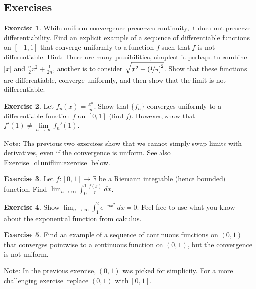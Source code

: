 \documentclass[12pt]{book}
\newcommand{\abs}[1]{\left\lvert {#1} \right\rvert}
\newcommand{\R}{{\mathbb{R}}}
\theoremstyle{plain}
\theoremstyle{remark}
\theoremstyle{definition}
\newenvironment{exnote}{\small}{}
\theoremstyle{exercise}
\newtheorem{exercise}{Exercise}[section]
\theoremstyle{example}
\newcommand{\exerciseref}[1]{\hyperref[#1]{Exercise~\ref*{#1}}}
\begin{document}
\subsection{Exercises}

\begin{exercise}
While uniform convergence preserves continuity, it does not preserve
differentiability.  Find an explicit example of a sequence of
differentiable functions on $[-1,1]$ that converge uniformly to
a function $f$ such that $f$ is not differentiable.
Hint:
There are many possibilities,
simplest is perhaps to combine $\abs{x}$ and $\frac{n}{2}x^2 +
\frac{1}{2n}$, another is to
consider $\sqrt{x^2+{(\nicefrac{1}{n})}^2}$.  Show that these functions are differentiable,
converge uniformly, and then show that the limit is not differentiable.
\end{exercise}

\begin{exercise}
Let $f_n(x) = \frac{x^n}{n}$.  Show that $\{ f_n \}$ converges uniformly to
a differentiable function $f$ on $[0,1]$ (find $f$).  However, show that
$f'(1) \not= \lim\limits_{n\to\infty} f_n'(1)$.
\end{exercise}

\begin{exnote}
Note: The previous two exercises show that
we cannot simply swap limits with derivatives, even if the convergence is
uniform.  See also \exerciseref{c1uniflim:exercise} below.
\end{exnote}

\begin{exercise}
Let $f \colon [0,1] \to \R$ be a Riemann integrable (hence bounded)
function.  Find
$\displaystyle \lim_{n\to\infty} \int_0^1 \frac{f(x)}{n} ~dx$.
\end{exercise}

\begin{exercise}
Show
$\displaystyle \lim_{n\to\infty} \int_1^2 e^{-nx^2} ~dx = 0$.  Feel free to
use
what you know about the exponential function from calculus.
\end{exercise}

\begin{exercise}
Find an example of a sequence of continuous functions on $(0,1)$ that converges 
pointwise to a continuous function on $(0,1)$, but the convergence is not
uniform.
\end{exercise}

\begin{exnote}
Note: In the previous exercise, $(0,1)$ was picked for simplicity.  For a
more challenging exercise, replace $(0,1)$ with $[0,1]$.
\end{exnote}
\end{document}
